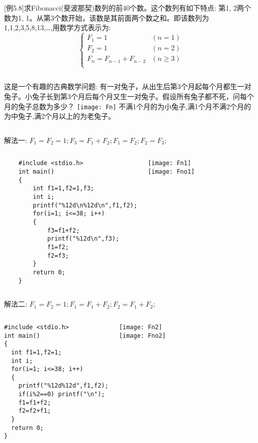 \begin{frame}
\small
$[$例5.8$]$求Fibonacci(斐波那契)数列的前40个数。这个数列有如下特点: 第1, 2两个数为1, 1。从第3个数开始，该数是其前面两个数之和。即该数列为1,1,2,3,5,8,13,\dots,用数学方式表示为:
\[
\begin{cases}
F_1=1 & (n=1)\\
F_2=1 & (n=2)\\
F_n=F_{n-1}+F_{n-2} & (n\ge 3)\\
\end{cases}
\]
\begin{columns}
	这是一个有趣的古典数学问题: 有一对兔子，从出生后第3个月起每个月都生一对兔子。小兔子长到第3个月后每个月又生一对兔子。假设所有兔子都不死，问每个月的兔子总数为多少？
	\texttt{[image: Fn]}
	\scriptsize
	不满1个月的为小兔子,满1个月不满2个月的为中兔子,满2个月以上的为老兔子。
\end{columns}
\end{frame}

\begin{frame}
解法一: $F_1=F_2=1; F_3=F_1+F_2; F_1=F_2; F_2=F_3; $
\begin{columns}
	\begin{lstlisting}
    #include <stdio.h>
    int main()
    {
        int f1=1,f2=1,f3;
        int i;
        printf("%12d\n%12d\n",f1,f2);
        for(i=1; i<=38; i++)
        {
            f3=f1+f2;
            printf("%12d\n",f3);
            f1=f2;
            f2=f3;
        }
        return 0;
    }
    \end{lstlisting}
	\texttt{[image: Fn1]}\\
	\texttt{[image: Fno1]}
\end{columns}
\end{frame}

\begin{frame}
解法二: $F_1=F_2=1; F_1=F_1+F_2; F_2=F_1+F_2; $
\begin{columns}
\begin{lstlisting}
#include <stdio.h>
int main()
{
  int f1=1,f2=1;
  int i;
  for(i=1; i<=38; i++)
  {
    printf("%12d%12d",f1,f2);
    if(i%2==0) printf("\n");
    f1=f1+f2;
    f2=f2+f1;
  }
  return 0;
}
\end{lstlisting}
	\texttt{[image: Fn2]}\\
	\texttt{[image: Fno2]}
\end{columns}
\end{frame}

